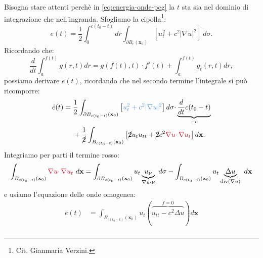 \documentclass[10pt,a4paper,twoside,openright]{book}
\newcommand{\x}{\mathbf{x}}
\begin{document}
\begin{dimostrazione}
	Bisogna stare attenti perchè in \eqref{eq:energia-onde-pcg} la $t$ sta sia nel dominio di integrazione che nell'ingranda. Sfogliamo la cipolla\footnote{Cit. Gianmaria Verzini.}:
	\begin{equation*}
		e( t) =\frac{1}{2}\int _{0}^{c( t_{0} -t)} dr\int _{\partial B_{r}(\x_{0})}\left[ u_{t}^{2} +c^{2}| \nabla u| ^{2}\right] \ d\sigma .
	\end{equation*}
	Ricordando che:
	\begin{equation*}
		\frac{d}{dt}\int _{a}^{f( t)} g( r,t) dr=g( f( t),t) \cdotp f'( t) +\int _{a}^{f( t)} g_{t}( r,t) dr,
	\end{equation*}
	possiamo derivare $e( t)$, ricordando che nel secondo termine l'integrale si può ricomporre:
	\begin{align*}
		\dot{e}( t) & =\frac{1}{2}\int _{\partial B_{c( t_{0} -t)}(\x_{0})}\left[\textcolor[rgb]{0.29,0.56,0.89}{u_{t}^{2}+c^{2}| \nabla u| ^{2}}\right] d\sigma \cdotp \underbrace{\frac{d}{dt} c( t_{0} -t)}_{-c} \\
		            & \ \ \ \ +\frac{1}{\cancel{2}}\int _{B_{c( t_{0} -t)}(\x_{0})}\left[\cancel{2} u_{t} u_{tt} +\cancel{2} c^{2}\textcolor[rgb]{0.82,0.01,0.11}{\nabla u\cdotp \nabla u_{t}}\right] d\x.                                                                                                                                                                                                 
	\end{align*}
	Integriamo per parti il termine rosso:
	\begin{equation*}
		\int _{B_{c( t_{0} -t)}(\x_{0})}\textcolor[rgb]{0.82,0.01,0.11}{\nabla u\cdotp \nabla u_{t}} \ d\x =\int _{\partial B_{c( t_{0} -t)}(\x_{0})} u_{t}\underbrace{u_{\bm{\nu }}}_{\nabla u\cdotp \bm{\nu }} \ d\sigma -\int _{B_{c( t_{0} -t)}(\x_{0})} u_{t}\underbrace{\Delta u}_{\mathrm{div}( \nabla u)} \ d\x
	\end{equation*}
	e usiamo l'equazione delle onde omogenea:
	\begin{align*}
		\dot{e}( t) & =\int _{B_{c( t_{0} -t)}(\x_{0})} u_{t}(\overbrace{u_{tt} -c^{2} \Delta u}^{f=0}) d\x                                                                                                                                                                                                                                                                                                                                                                                       \\

\end{align*}
\end{dimostrazione}
\end{document}
